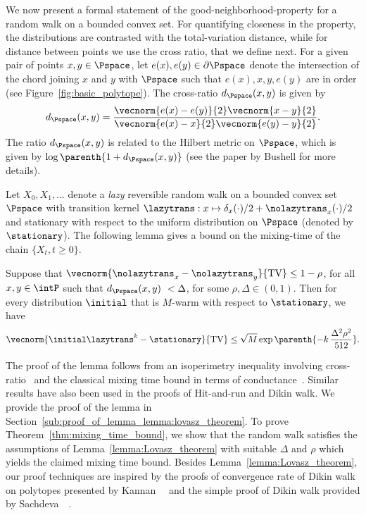 We now present a formal statement of the good-neighborhood-property for a random walk on a bounded convex set.
For quantifying closeness in the property, the distributions are contrasted with the total-variation distance, while for distance between points we use the cross ratio, that we define next.
For a given pair of points $x, y \in \Pspace$, let $e(x), e(y) \in \partial \Pspace$ denote the intersection of the chord joining $x$ and $y$ with $\Pspace$ such that $e(x), x, y, e(y)$ are in order (see Figure~\ref{fig:basic_polytope}).
The cross-ratio $d_\Pspace(x, y)$ is given by
\begin{align}
\label{eq:def_cross_ratio}
	d_\Pspace(x, y) = \frac{ \vecnorm{e(x)-e(y)}{2} \vecnorm{x-y}{2} }{ \vecnorm{e(x)-x}{2} \vecnorm{e(y)-y}{2} }.
\end{align}
The ratio $d_\Pspace(x, y)$ is related to the Hilbert metric on $\Pspace$, which is given by $\log \parenth{ 1+d_\Pspace(x, y)}$ (see the paper by Bushell \cite{bushell1973hilbert} for more details).

Let $X_0, X_1, \ldots $ denote a \emph{lazy} reversible random walk on a bounded convex set $\Pspace$ with transition kernel $\lazytrans :x\mapsto \delta_x(\cdot)/2 + \nolazytrans_x(\cdot)/2$ and stationary with respect to the uniform distribution on $\Pspace$ (denoted by $\stationary$).
The following lemma gives a bound on the mixing-time of the chain $\{X_t, t\geq 0\}$.
\begin{lemma}
	\label{lemma:Lovasz_theorem}
	Suppose that $\vecnorm{\nolazytrans_x- \nolazytrans_y}{\text{TV}} \leq 1 - \rho$, for all $x, y \in \intP$ such that $d_\Pspace(x, y)~< \Delta $, for some $\rho,\Delta \in (0, 1)$.
	Then for every distribution $\initial$ that is $M$-warm with respect to $\stationary$, we have
	\begin{align*}
		\vecnorm{\initial \lazytrans^k-\stationary}{\text{TV}} \leq \displaystyle\sqrt{M}\exp\parenth{-k\,\frac{\Delta^2 \rho^2}{512}}.
	\end{align*}
\end{lemma}
The proof of the lemma follows from an isoperimetry inequality involving cross-ratio~\cite{lovasz1999hit} and the classical mixing time bound in terms of conductance~\cite{lovasz1993random}.
Similar results have also been used in the proofs of Hit-and-run and Dikin walk.
We provide the proof of the lemma in Section~\ref{sub:proof_of_lemma_lemma:lovasz_theorem}.
To prove Theorem~\ref{thm:mixing_time_bound}, we show that the random walk  satisfies the assumptions of Lemma~\ref{lemma:Lovasz_theorem} with suitable $\Delta$ and $\rho$ which yields the claimed mixing time bound.
Besides Lemma~\ref{lemma:Lovasz_theorem}, our proof techniques are inspired by the proofs of convergence rate of Dikin walk on polytopes presented by Kannan~\etal~\cite{kannan2012random}
and the simple proof of Dikin walk provided by Sachdeva~\etal~\cite{sachdeva2016mixing}.

